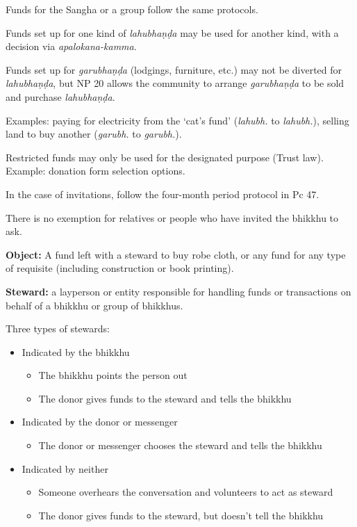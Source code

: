 Funds for the Sangha or a group follow the same protocols.

Funds set up for one kind of \emph{lahubhaṇḍa} may be used for another
kind, with a decision via \emph{apalokana-kamma}.

Funds set up for \emph{garubhaṇḍa} (lodgings, furniture, etc.) may not
be diverted for \emph{lahubhaṇḍa}, but NP 20 allows the community to
arrange \emph{garubhaṇḍa} to be sold and purchase \emph{lahubhaṇḍa}.

Examples: paying for electricity from the `cat's fund' (\emph{lahubh.}
to \emph{lahubh.}), selling land to buy another (\emph{garubh.} to
\emph{garubh.}).

Restricted funds may only be used for the designated purpose (Trust
law). Example: donation form selection options.

In the case of invitations, follow the four-month period protocol in Pc
47.

There is no exemption for relatives or people who have invited the
bhikkhu to ask.

\textbf{Object:} A fund left with a steward to buy robe cloth, or any
fund for any type of requisite (including construction or book
printing).

\enlargethispage*{\baselineskip}

\textbf{Steward:} a layperson or entity responsible for handling funds
or transactions on behalf of a bhikkhu or group of bhikkhus.

Three types of stewards:

\begin{itemize}
\tightlist
\item
  Indicated by the bhikkhu

  \begin{itemize}
  \tightlist
  \item
    The bhikkhu points the person out
  \item
    The donor gives funds to the steward and tells the bhikkhu
  \end{itemize}
\item
  Indicated by the donor or messenger

  \begin{itemize}
  \tightlist
  \item
    The donor or messenger chooses the steward and tells the bhikkhu
  \end{itemize}
\item
  Indicated by neither

  \begin{itemize}
  \tightlist
  \item
    Someone overhears the conversation and volunteers to act as steward
  \item
    The donor gives funds to the steward, but doesn't tell the bhikkhu
  \end{itemize}
\end{itemize}

